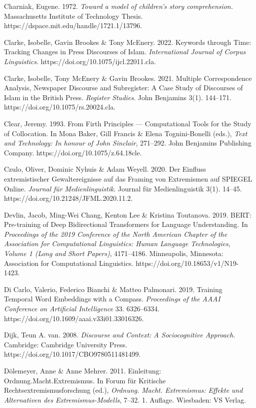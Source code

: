 Charniak, Eugene. 1972. \emph{Toward a model of children's story comprehension.} Massachusetts Institute of Technology Thesis. https://dspace.mit.edu/handle/1721.1/13796.

Clarke, Isobelle, Gavin Brookes \& Tony McEnery. 2022. Keywords through Time: Tracking Changes in Press Discourses of Islam. \emph{International Journal of Corpus Linguistics}. https://doi.org/10.1075/ijcl.22011.cla.

Clarke, Isobelle, Tony McEnery \& Gavin Brookes. 2021. Multiple Correspondence Analysis, Newspaper Discourse and Subregister: A Case Study of Discourses of Islam in the British Press. \emph{Register Studies}. John Benjamins 3(1). 144--171. https://doi.org/10.1075/rs.20024.cla.

Clear, Jeremy. 1993. From Firth Principles --- Computational Tools for the Study of Collocation. In Mona Baker, Gill Francis \& Elena Tognini-Bonelli (eds.), \emph{Text and Technology: In honour of John Sinclair}, 271--292. John Benjamins Publishing Company. https://doi.org/10.1075/z.64.18cle.

Czulo, Oliver, Dominic Nyhuis \& Adam Weyell. 2020. Der Einfluss extremistischer Gewaltereignisse auf das Framing von Extremismen auf SPIEGEL Online. \emph{Journal für Medienlinguistik}. Journal für Medienlinguistik 3(1). 14--45. https://doi.org/10.21248/JFML.2020.11.2.

Devlin, Jacob, Ming-Wei Chang, Kenton Lee \& Kristina Toutanova. 2019. BERT: Pre-training of Deep Bidirectional Transformers for Language Understanding. In \emph{Proceedings of the 2019 Conference of the North American Chapter of the Association for Computational Linguistics: Human Language Technologies, Volume 1 (Long and Short Papers)}, 4171--4186. Minneapolis, Minnesota: Association for Computational Linguistics. https://doi.org/10.18653/v1/N19-1423.

Di Carlo, Valerio, Federico Bianchi \& Matteo Palmonari. 2019. Training Temporal Word Embeddings with a Compass. \emph{Proceedings of the AAAI Conference on Artificial Intelligence} 33. 6326--6334. https://doi.org/10.1609/aaai.v33i01.33016326.

Dijk, Teun A. van. 2008. \emph{Discourse and Context: A Sociocognitive Approach}. Cambridge: Cambridge University Press. https://doi.org/10.1017/CBO9780511481499.

Dölemeyer, Anne \& Anne Mehrer. 2011. Einleitung: Ordnung.Macht.Extremismus. In Forum für Kritische Rechtsextremismusforschung (ed.), \emph{Ordnung. Macht. Extremismus: Effekte und Alternativen des Extremismus-Modells}, 7--32. 1. Auflage. Wiesbaden: VS Verlag.

